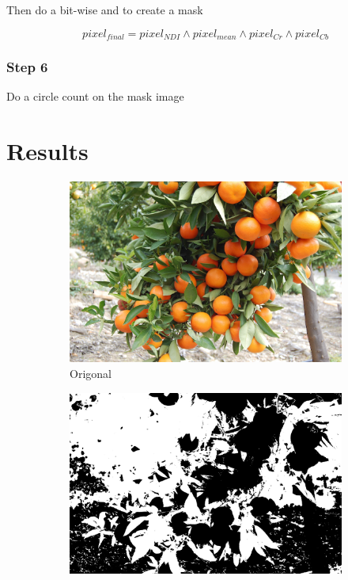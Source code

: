 \documentclass[conference]{IEEEtran}
\begin{document}
Then do a bit-wise and to create a mask

\begin{equation}
pixel_{final}=pixel_{NDI} \land pixel_{mean} \land pixel_{Cr} \land pixel_{Cb} 
\end{equation}

\subsubsection{Step 6}
Do a circle count  on the mask image




\section{Results}

\begin{figure}
  \begin{subfigure}{.33\linewidth}
 	 \includegraphics[width=\linewidth]{citrus1/citrus1_orig.jpg}\hfill
	 \caption{Origonal}
  \end{subfigure}
  \begin{subfigure}{.33\linewidth}
  	\includegraphics[width=\linewidth]{citrus1/citrus1_NDI.jpg}\hfill

\end{subfigure}
\end{figure}
\end{document}
